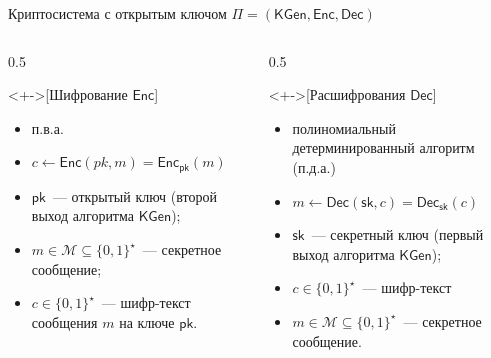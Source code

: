 \documentclass[aspectratio=169, 12pt]{beamer}
\newcommand{\algo}[1]{\mathsf{#1}}
\begin{document}
\begin{frame}[label={sec:orged56f35}]{Криптосистема с открытым ключом \(\Pi=(\algo{KGen}, \algo{Enc}, \algo{Dec})\)}
    \begin{columns}[t]
        \begin{column}{0.5\columnwidth}
            \begin{definition}<+->[Шифрование \(\algo{Enc}\)]\label{sec:org98ede05}
                \begin{itemize}[<+->]
                    \item п.в.а.
                    \item \(c\gets \algo{Enc}(pk,m)=\algo{Enc}_{\algo{pk}}(m)\)
                    \item \(\algo{pk}\)~--- открытый ключ (второй выход алгоритма \(\algo{KGen}\));
                    \item \(m\in\mathcal{M}\subseteq \{0,1\}^{\star}\)~--- \alert{секретное  сообщение};
                    \item \(c\in \{0,1\}^{\star}\)~--- \alert{шифр-текст} сообщения \(m\) на ключе \(\algo{pk}\).
                \end{itemize}
            \end{definition}
        \end{column}
        \begin{column}[t]{0.5\columnwidth}
            \begin{definition}<+->[Расшифрования \(\algo{Dec}\)]\label{sec:orgf64e7a4}
                \begin{itemize}[<+->]
                    \item полиномиальный детерминированный алгоритм (п.д.а.)
                    \item \(m \gets \algo{Dec}(\algo{sk},c)=\algo{Dec}_{\algo{sk}}(c)\)
                    \item \(\algo{sk}\)~--- секретный ключ (первый выход алгоритма \(\algo{KGen}\));
                    \item \(c\in \{0,1\}^{\star}\)~--- \alert{шифр-текст}
                    \item \(m\in\mathcal{M}\subseteq \{0,1\}^{\star}\)~--- \alert{секретное сообщение}.
                \end{itemize}
            \end{definition}
        \end{column}
    \end{columns}
\end{frame}
\end{document}
